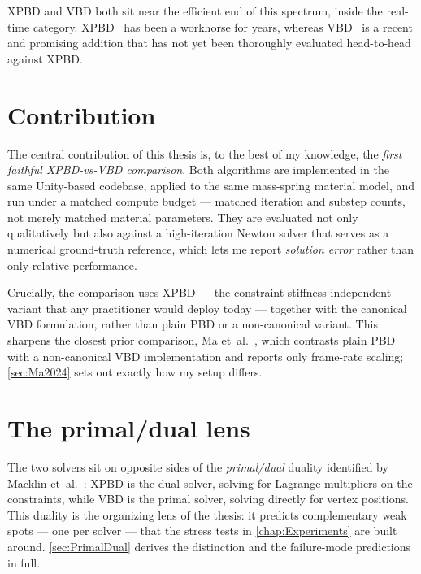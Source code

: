 XPBD and VBD both sit near the efficient end of this spectrum, inside the
real-time category. XPBD~\cite{10.1145/2994258.2994272} has been a workhorse for
years, whereas VBD~\cite{Chen2024} is a recent and promising addition that has
not yet been thoroughly evaluated head-to-head against XPBD.

\section{Contribution}
\label{sec:Contribution}
The central contribution of this thesis is, to the best of my knowledge, the
\emph{first faithful XPBD-vs-VBD comparison}. Both algorithms are implemented in
the same Unity-based codebase, applied to the same mass-spring material model,
and run under a matched compute budget --- matched iteration and substep counts,
not merely matched material parameters. They are evaluated not only qualitatively
but also against a high-iteration Newton solver that serves as a numerical
ground-truth reference, which lets me report \emph{solution error} rather than
only relative performance.

Crucially, the comparison uses XPBD --- the constraint-stiffness-independent
variant that any practitioner would deploy today --- together with the canonical
VBD formulation, rather than plain PBD or a non-canonical variant. This sharpens
the closest prior comparison, Ma et~al.~\cite{app142311072}, which contrasts
plain PBD with a non-canonical VBD implementation and reports only frame-rate
scaling; \autoref{sec:Ma2024} sets out exactly how my setup differs.

\section{The primal/dual lens}
\label{sec:PrimalDualLens}
The two solvers sit on opposite sides of the \emph{primal/dual} duality
identified by Macklin et~al.~\cite{10.1111/cgf.14104}: XPBD is the dual solver,
solving for Lagrange multipliers on the constraints, while VBD is the primal
solver, solving directly for vertex positions. This duality is the organizing
lens of the thesis: it predicts complementary weak spots --- one per solver ---
that the stress tests in \autoref{chap:Experiments} are built around.
\autoref{sec:PrimalDual} derives the distinction and the failure-mode
predictions in full.

